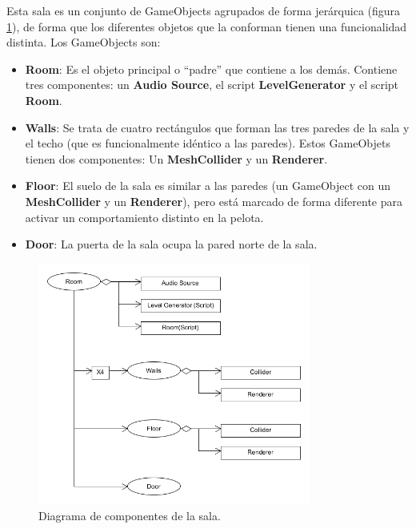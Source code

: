 Esta sala es un conjunto de GameObjects agrupados de forma jerárquica (figura \ref{diagrama_sala}), de forma que los diferentes objetos que la conforman tienen una funcionalidad distinta. Los GameObjects son:
\begin{itemize}
\item \textbf{Room}: Es el objeto principal o ``padre'' que contiene a los demás. Contiene tres componentes: un \textbf{Audio Source}, el script \textbf{LevelGenerator} y el script \textbf{Room}.
\item \textbf{Walls}: Se trata de cuatro rectángulos que forman las tres paredes de la sala y el techo (que es funcionalmente idéntico a las paredes). Estos GameObjets tienen dos componentes: Un \textbf{MeshCollider} y un \textbf{Renderer}.
\item \textbf{Floor}: El suelo de la sala es similar a las paredes (un GameObject con un \textbf{MeshCollider} y un \textbf{Renderer}), pero está marcado de forma diferente para activar un comportamiento distinto en la pelota.
\item \textbf{Door}: La puerta de la sala ocupa la pared norte de la sala. 
\end{itemize}
\begin{figure}[h]
	\includegraphics[width=0.8\textwidth]{images/estructura/niveles/room}
	\centering
	\caption{Diagrama de componentes de la sala.}
	\label{diagrama_sala}
\end{figure}


